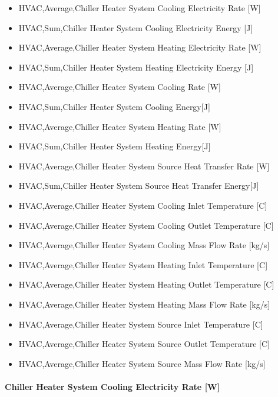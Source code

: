 \begin{itemize}
    \item
    HVAC,Average,Chiller Heater System Cooling Electricity Rate {[}W{]}
    \item
    HVAC,Sum,Chiller Heater System Cooling Electricity Energy {[}J{]}
    \item
    HVAC,Average,Chiller Heater System Heating Electricity Rate {[}W{]}
    \item
    HVAC,Sum,Chiller Heater System Heating Electricity Energy {[}J{]}
    \item
    HVAC,Average,Chiller Heater System Cooling Rate {[}W{]}
    \item
    HVAC,Sum,Chiller Heater System Cooling Energy{[}J{]}
    \item
    HVAC,Average,Chiller Heater System Heating Rate {[}W{]}
    \item
    HVAC,Sum,Chiller Heater System Heating Energy{[}J{]}
    \item
    HVAC,Average,Chiller Heater System Source Heat Transfer Rate {[}W{]}
    \item
    HVAC,Sum,Chiller Heater System Source Heat Transfer Energy{[}J{]}
    \item
    HVAC,Average,Chiller Heater System Cooling Inlet Temperature {[}C{]}
    \item
    HVAC,Average,Chiller Heater System Cooling Outlet Temperature {[}C{]}
    \item
    HVAC,Average,Chiller Heater System Cooling Mass Flow Rate {[}kg/s{]}
    \item
    HVAC,Average,Chiller Heater System Heating Inlet Temperature {[}C{]}
    \item
    HVAC,Average,Chiller Heater System Heating Outlet Temperature {[}C{]}
    \item
    HVAC,Average,Chiller Heater System Heating Mass Flow Rate {[}kg/s{]}
    \item
    HVAC,Average,Chiller Heater System Source Inlet Temperature {[}C{]}
    \item
    HVAC,Average,Chiller Heater System Source Outlet Temperature {[}C{]}
    \item
    HVAC,Average,Chiller Heater System Source Mass Flow Rate {[}kg/s{]}
\end{itemize}

\paragraph{Chiller Heater System Cooling Electricity Rate {[}W{]}}\label{chiller-heater-system-cooling-electric-power-w}


